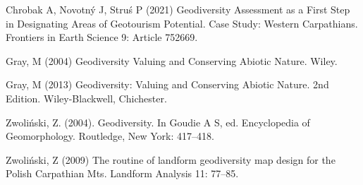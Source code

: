 {Chrobak A, Novotný J, Struś P (2021) Geodiversity Assessment as a First Step in Designating Areas of Geotourism Potential. Case Study: Western Carpathians. Frontiers in Earth Science 9: Article 752669.
	
Gray, M (2004) Geodiversity Valuing and Conserving Abiotic Nature. Wiley.
	
Gray, M (2013) Geodiversity: Valuing and Conserving Abiotic Nature. 2nd Edition. Wiley-Blackwell, Chichester.
	
Zwoliński, Z. (2004). Geodiversity. In Goudie A S, ed. Encyclopedia of Geomorphology. Routledge, New York: 417–418.
	
Zwoliński, Z (2009) The routine of landform geodiversity map design for the Polish Carpathian Mts. Landform Analysis 11: 77–85.
}

